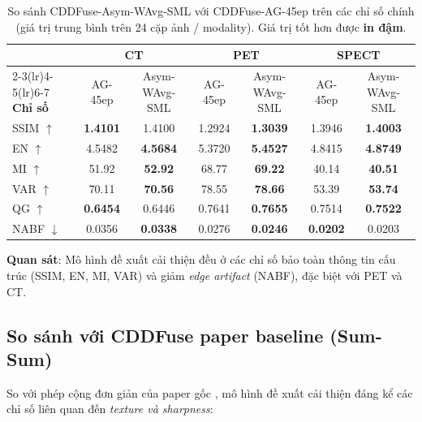 \documentclass[12pt,a4paper]{article}
\begin{document}
\begin{table}[h]
\centering
\small
\setlength{\tabcolsep}{4pt}
\caption{So sánh CDDFuse-Asym-WAvg-SML với CDDFuse-AG-45ep trên các chỉ số chính (giá trị trung bình trên 24 cặp ảnh / modality). Giá trị tốt hơn được \textbf{in đậm}.}
\begin{tabular}{lcccccc}
\toprule
& \multicolumn{2}{c}{\textbf{CT}} & \multicolumn{2}{c}{\textbf{PET}} & \multicolumn{2}{c}{\textbf{SPECT}} \\
\cmidrule(lr){2-3}\cmidrule(lr){4-5}\cmidrule(lr){6-7}
\textbf{Chỉ số} & AG-45ep & Asym-WAvg-SML & AG-45ep & Asym-WAvg-SML & AG-45ep & Asym-WAvg-SML \\
\midrule
SSIM $\uparrow$ & \textbf{1.4101} & 1.4100 & 1.2924 & \textbf{1.3039} & 1.3946 & \textbf{1.4003} \\
EN $\uparrow$   & 4.5482 & \textbf{4.5684} & 5.3720 & \textbf{5.4527} & 4.8415 & \textbf{4.8749} \\
MI $\uparrow$   & 51.92 & \textbf{52.92} & 68.77 & \textbf{69.22} & 40.14 & \textbf{40.51} \\
VAR $\uparrow$  & 70.11 & \textbf{70.56} & 78.55 & \textbf{78.66} & 53.39 & \textbf{53.74} \\
QG $\uparrow$   & \textbf{0.6454} & 0.6446 & 0.7641 & \textbf{0.7655} & 0.7514 & \textbf{0.7522} \\
NABF $\downarrow$ & 0.0356 & \textbf{0.0338} & 0.0276 & \textbf{0.0246} & \textbf{0.0202} & 0.0203 \\
\bottomrule
\end{tabular}
\end{table}

\textbf{Quan sát}: Mô hình đề xuất cải thiện đều ở các chỉ số bảo toàn thông tin cấu trúc (SSIM, EN, MI, VAR) và giảm \emph{edge artifact} (NABF), đặc biệt với PET và CT.

\subsection{So sánh với CDDFuse paper baseline (Sum-Sum)}

So với phép cộng đơn giản của paper gốc \cite{zhao2023cddfuse}, mô hình đề xuất cải thiện đáng kể các chỉ số liên quan đến \emph{texture và sharpness}:
\end{document}
